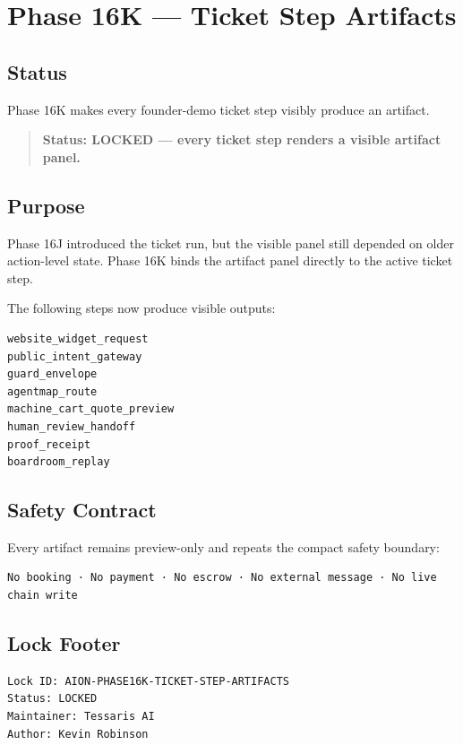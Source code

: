 \section{Phase 16K --- Ticket Step Artifacts}
\label{sec:phase16k-ticket-step-artifacts}

\subsection{Status}

Phase 16K makes every founder-demo ticket step visibly produce an artifact.

\begin{quote}
\textbf{Status: LOCKED --- every ticket step renders a visible artifact panel.}
\end{quote}

\subsection{Purpose}

Phase 16J introduced the ticket run, but the visible panel still depended on older action-level state.
Phase 16K binds the artifact panel directly to the active ticket step.

The following steps now produce visible outputs:

\begin{verbatim}
website_widget_request
public_intent_gateway
guard_envelope
agentmap_route
machine_cart_quote_preview
human_review_handoff
proof_receipt
boardroom_replay
\end{verbatim}

\subsection{Safety Contract}

Every artifact remains preview-only and repeats the compact safety boundary:

\begin{verbatim}
No booking · No payment · No escrow · No external message · No live chain write
\end{verbatim}

\subsection{Lock Footer}

\begin{verbatim}
Lock ID: AION-PHASE16K-TICKET-STEP-ARTIFACTS
Status: LOCKED
Maintainer: Tessaris AI
Author: Kevin Robinson
\end{verbatim}
